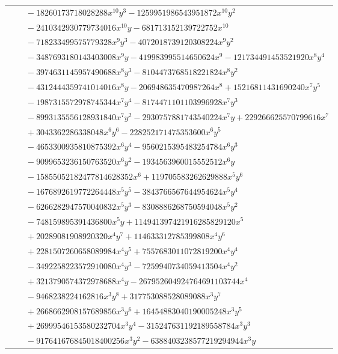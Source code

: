 \documentclass[11pt]{article}
\begin{document}
\begin{longtable}{@{}ll@{}}
 & $\quad -18260173718028288x^{10}y^{3}-1259951986543951872x^{10}y^{2}$\\
 & $\quad -2410342930779734016x^{10}y-681713152139722752x^{10}$\\
 & $\quad -718233499575779328x^{9}y^{3}-4072018739120308224x^{9}y^{2}$\\
 & $\quad -3487693180143403008x^{9}y-419983995514650624x^{9}-121734491453521920x^{8}y^{4}$\\
 & $\quad -3974631145957490688x^{8}y^{3}-8104473768518221824x^{8}y^{2}$\\
 & $\quad -4312444359741014016x^{8}y-206948635470987264x^{8}+15216811431690240x^{7}y^{5}$\\
 & $\quad -1987315572978745344x^{7}y^{4}-8174471101103996928x^{7}y^{3}$\\
 & $\quad -8993135556128931840x^{7}y^{2}-2930757881743540224x^{7}y+229266625570799616x^{7}$\\
 & $\quad +3043362286338048x^{6}y^{6}-228252171475353600x^{6}y^{5}$\\
 & $\quad -4653300935810875392x^{6}y^{4}-9560215395483254784x^{6}y^{3}$\\
 & $\quad -9099653236150763520x^{6}y^{2}-1934563960015552512x^{6}y$\\
 & $\quad -15855052182477814628352x^{6}+119705583262629888x^{5}y^{6}$\\
 & $\quad -1676892619772264448x^{5}y^{5}-3843766567644954624x^{5}y^{4}$\\
 & $\quad -6266282947570040832x^{5}y^{3}-8308886268750594048x^{5}y^{2}$\\
 & $\quad -748159895391436800x^{5}y+114941397421916285829120x^{5}$\\
 & $\quad +20289081908920320x^{4}y^{7}+114633312785399808x^{4}y^{6}$\\
 & $\quad +2281507260658089984x^{4}y^{5}+7557683011072819200x^{4}y^{4}$\\
 & $\quad -3492258223572910080x^{4}y^{3}-7259940734059413504x^{4}y^{2}$\\
 & $\quad +3213790574372978688x^{4}y-267952604924764691103744x^{4}$\\
 & $\quad -9468238224162816x^{3}y^{8}+317753088528089088x^{3}y^{7}$\\
 & $\quad +2668662908157689856x^{3}y^{6}+16454883040190005248x^{3}y^{5}$\\
 & $\quad +26999546153580232704x^{3}y^{4}-315247631192189558784x^{3}y^{3}$\\
 & $\quad -917641676845018400256x^{3}y^{2}-6388403238577219294944x^{3}y$\\

\end{longtable}
\end{document}
